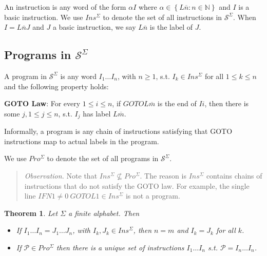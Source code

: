 \documentclass[a4paper, 12pt]{article}
\newtheorem{theorem}{Theorem}
\newtheorem{theorem}{Theorem}
\begin{document}
An instruction is any word of the form $\alpha I$ where $\alpha \in \left\{ L
\overline{n}: n \in \mathbb{N} \right\} $ and $I$ is a basic instruction. We use
$Ins^{\Sigma}$ to denote the set of all instructions in $\mathcal{S}^{\Sigma}$.
When $I = L \overline{n} J$ and $J$ a basic instruction, we say $L \overline{n}$
is the label of $J$.

\subsection{Programs in $\mathcal{S}^{\Sigma}$}

A program in $\mathcal{S}^{\Sigma}$ is any word $I_1 \ldots I_n$, with $n \geq
1$, s.t. $I_k \in Ins^{\Sigma}$ for all $1 \leq k \leq n$ and the following
property holds:

\textbf{GOTO Law}: For every $1 \leq i \leq n$, if $GOTOL \overline{m}$ is
the end of $Ii$, then there is some $j, 1 \leq j \leq n$, s.t. $I_j$ has label
$L \overline{m}$.

Informally, a program is any chain of instructions satisfying that GOTO
instructions map to actual labels in the program.


We use $Pro^{\Sigma}$ to denote the set of all programs in
$\mathcal{S}^{\Sigma}$.


\small
\begin{quote}

    \textit{Observation.} Note that $Ins^{\Sigma} \not\subseteq Pro^{\Sigma}$.
    The reason is  $Ins^\Sigma$ contains chains of instructions that do
    not satisfy the GOTO law. For example, the single line $ IF N1 \neq 0 ~
    GOTO L1 \in Ins^{\Sigma}$ is not a program.

\end{quote}
\normalsize


\begin{theorem}
    Let $\Sigma$ a finite alphabet. Then 

    \begin{itemize}
        \item If $I_1 \ldots I_n = J_1 \ldots J_n$, with $I_k, J_k \in
            Ins^{\Sigma}$, then $n = m$ and $I_k = J_k$ for all $k$.
        \item If $\mathcal{P} \in Pro^{\Sigma}$ then there is a unique set of
            instructions $I_1 \ldots I_n$ s.t. $\mathcal{P} = I_n \ldots I_n$.
    \end{itemize}
\end{theorem}
\end{document}
